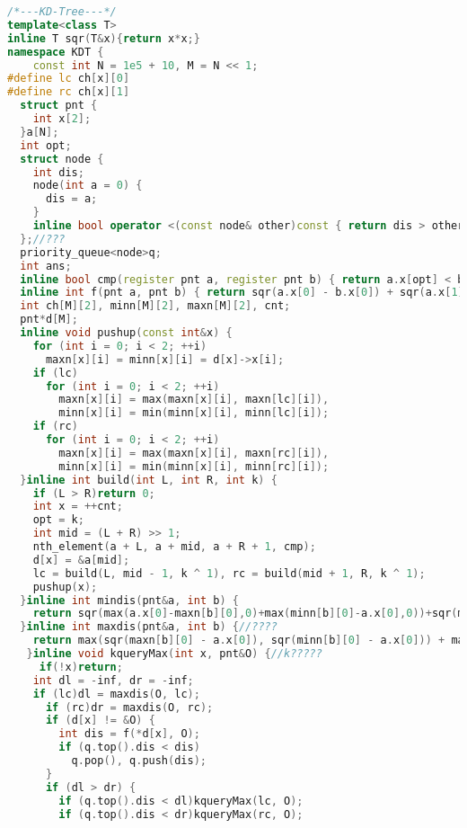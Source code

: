 \begin{lstlisting}[language=C++]
/*---KD-Tree---*/
template<class T>
inline T sqr(T&x){return x*x;}
namespace KDT { 
    const int N = 1e5 + 10, M = N << 1;
#define lc ch[x][0]
#define rc ch[x][1]
  struct pnt {
    int x[2];
  }a[N];
  int opt;
  struct node { 
    int dis; 
    node(int a = 0) { 
      dis = a; 
    }
    inline bool operator <(const node& other)const { return dis > other.dis; } 
  };//??? 
  priority_queue<node>q;
  int ans;
  inline bool cmp(register pnt a, register pnt b) { return a.x[opt] < b.x[opt]; }
  inline int f(pnt a, pnt b) { return sqr(a.x[0] - b.x[0]) + sqr(a.x[1] - b.x[1]); }
  int ch[M][2], minn[M][2], maxn[M][2], cnt;
  pnt*d[M];
  inline void pushup(const int&x) {
    for (int i = 0; i < 2; ++i)
      maxn[x][i] = minn[x][i] = d[x]->x[i];
    if (lc)
      for (int i = 0; i < 2; ++i)
        maxn[x][i] = max(maxn[x][i], maxn[lc][i]), 
        minn[x][i] = min(minn[x][i], minn[lc][i]);
    if (rc)
      for (int i = 0; i < 2; ++i)
        maxn[x][i] = max(maxn[x][i], maxn[rc][i]), 
        minn[x][i] = min(minn[x][i], minn[rc][i]);
  }inline int build(int L, int R, int k) {
    if (L > R)return 0;
    int x = ++cnt; 
    opt = k;
    int mid = (L + R) >> 1;
    nth_element(a + L, a + mid, a + R + 1, cmp);
    d[x] = &a[mid];
    lc = build(L, mid - 1, k ^ 1), rc = build(mid + 1, R, k ^ 1);
    pushup(x);
  }inline int mindis(pnt&a, int b) {
    return sqr(max(a.x[0]-maxn[b][0],0)+max(minn[b][0]-a.x[0],0))+sqr(max(a.x[1]-maxn[b][1],0)+max(minn[b][1]-a.x[1],0));
  }inline int maxdis(pnt&a, int b) {//????
    return max(sqr(maxn[b][0] - a.x[0]), sqr(minn[b][0] - a.x[0])) + max(sqr(maxn[b][1] - a.x[1]), sqr(minn[b][1] - a.x[1]));
   }inline void kqueryMax(int x, pnt&O) {//k?????
     if(!x)return;
    int dl = -inf, dr = -inf;
   	if (lc)dl = maxdis(O, lc);
      if (rc)dr = maxdis(O, rc);
      if (d[x] != &O) {
        int dis = f(*d[x], O);
        if (q.top().dis < dis)
          q.pop(), q.push(dis);
      }
      if (dl > dr) { 
        if (q.top().dis < dl)kqueryMax(lc, O); 
        if (q.top().dis < dr)kqueryMax(rc, O); 

\end{lstlisting}

